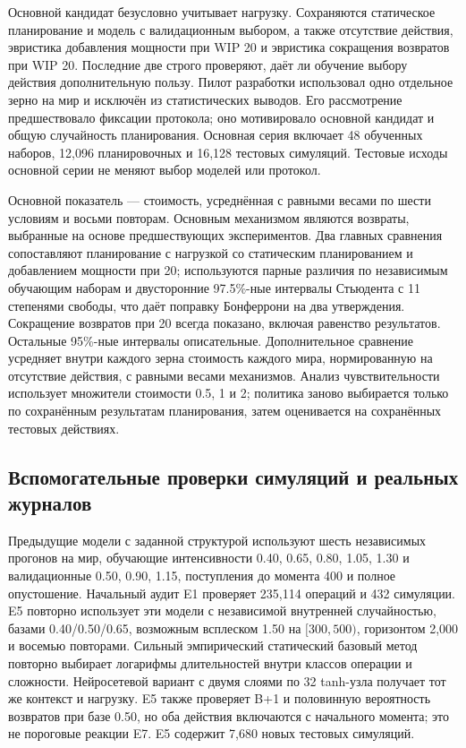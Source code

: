 \documentclass[runningheads]{llncs}
\begin{document}
Основной кандидат безусловно учитывает нагрузку. Сохраняются статическое планирование и модель с валидационным выбором, а также отсутствие действия, эвристика добавления мощности при WIP 20 и эвристика сокращения возвратов при WIP 20. Последние две строго проверяют, даёт ли обучение выбору действия дополнительную пользу. Пилот разработки использовал одно отдельное зерно на мир и исключён из статистических выводов. Его рассмотрение предшествовало фиксации протокола; оно мотивировало основной кандидат и общую случайность планирования. Основная серия включает 48 обученных наборов, 12,096 планировочных и 16,128 тестовых симуляций. Тестовые исходы основной серии не меняют выбор моделей или протокол.

Основной показатель --- стоимость, усреднённая с равными весами по шести условиям и восьми повторам. Основным механизмом являются возвраты, выбранные на основе предшествующих экспериментов. Два главных сравнения сопоставляют планирование с нагрузкой со статическим планированием и добавлением мощности при 20; используются парные различия по независимым обучающим наборам и двусторонние 97.5\%-ные интервалы Стьюдента с 11 степенями свободы, что даёт поправку Бонферрони на два утверждения. Сокращение возвратов при 20 всегда показано, включая равенство результатов. Остальные 95\%-ные интервалы описательные. Дополнительное сравнение усредняет внутри каждого зерна стоимость каждого мира, нормированную на отсутствие действия, с равными весами механизмов. Анализ чувствительности использует множители стоимости 0.5, 1 и 2; политика заново выбирается только по сохранённым результатам планирования, затем оценивается на сохранённых тестовых действиях.

\subsection{Вспомогательные проверки симуляций и реальных журналов}
Предыдущие модели с заданной структурой используют шесть независимых прогонов на мир, обучающие интенсивности 0.40, 0.65, 0.80, 1.05, 1.30 и валидационные 0.50, 0.90, 1.15, поступления до момента 400 и полное опустошение. Начальный аудит E1 проверяет 235,114 операций и 432 симуляции. E5 повторно использует эти модели с независимой внутренней случайностью, базами 0.40/0.50/0.65, возможным всплеском 1.50 на $[300,500)$, горизонтом 2,000 и восемью повторами. Сильный эмпирический статический базовый метод повторно выбирает логарифмы длительностей внутри классов операции и сложности. Нейросетевой вариант с двумя слоями по 32 tanh-узла получает тот же контекст и нагрузку. E5 также проверяет B+1 и половинную вероятность возвратов при базе 0.50, но оба действия включаются с начального момента; это не пороговые реакции E7. E5 содержит 7,680 новых тестовых симуляций.
\end{document}
